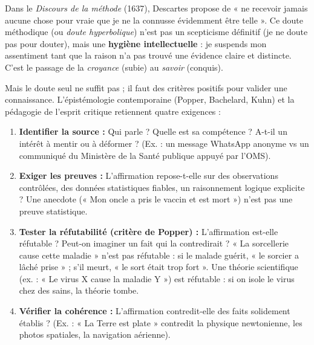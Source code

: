 \documentclass[11pt]{article}
\newcommand{\cle}[1]{{\popxbold\color{popdark}#1}}
\begin{document}
\begin{propriete}
Dans le \emph{Discours de la méthode} (1637), Descartes propose de « ne recevoir jamais aucune chose pour vraie que je ne la connusse évidemment être telle ». Ce \cle{doute méthodique} (ou \emph{doute hyperbolique}) n'est pas un scepticisme définitif (je ne doute pas pour douter), mais une \textbf{hygiène intellectuelle} : je suspends mon assentiment tant que la raison n'a pas trouvé une évidence claire et distincte. C'est le passage de la \emph{croyance} (subie) au \emph{savoir} (conquis).
\end{propriete}

Mais le doute seul ne suffit pas ; il faut des critères positifs pour valider une connaissance. L'épistémologie contemporaine (Popper, Bachelard, Kuhn) et la pédagogie de l'esprit critique retiennent quatre exigences :

\begin{methode}
\begin{enumerate}
    \item \textbf{Identifier la source :} Qui parle ? Quelle est sa compétence ? A-t-il un intérêt à mentir ou à déformer ? (Ex. : un message WhatsApp anonyme vs un communiqué du Ministère de la Santé publique appuyé par l'OMS).
    \item \textbf{Exiger les preuves :} L'affirmation repose-t-elle sur des observations contrôlées, des données statistiques fiables, un raisonnement logique explicite ? Une anecdote (« Mon oncle a pris le vaccin et est mort ») n'est pas une preuve statistique.
    \item \textbf{Tester la réfutabilité (critère de Popper) :} L'affirmation est-elle \cle{réfutable} ? Peut-on imaginer un fait qui la contredirait ? « La sorcellerie cause cette maladie » n'est pas réfutable : si le malade guérit, « le sorcier a lâché prise » ; s'il meurt, « le sort était trop fort ». Une théorie scientifique (ex. : « Le virus X cause la maladie Y ») est réfutable : si on isole le virus chez des sains, la théorie tombe.
    \item \textbf{Vérifier la cohérence :} L'affirmation contredit-elle des faits solidement établis ? (Ex. : « La Terre est plate » contredit la physique newtonienne, les photos spatiales, la navigation aérienne).
\end{enumerate}
\end{methode}
\end{document}
